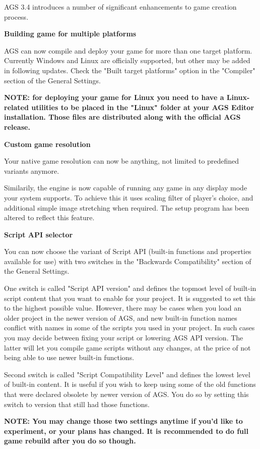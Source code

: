 AGS 3.4 introduces a number of significant enhancements to game creation process.

\bf{Building game for multiple platforms}

AGS can now compile and deploy your game for more than one target platform. Currently Windows and
Linux are officially supported, but other may be added in following updates. Check the "Built target platforms"
option in the "Compiler" section of the General Settings.

\bf{NOTE:} for deploying your game for Linux you need to have a Linux-related utilities to be placed in the
"Linux" folder at your AGS Editor installation. Those files are distributed along with the official AGS
release.

\bf{Custom game resolution}

Your native game resolution can now be anything, not limited to predefined variants anymore.

Similarily, the engine is now capable of running any game in any display mode your system supports.
To achieve this it uses scaling filter of player's choice, and additional simple image stretching
when required. The setup program has been altered to reflect this feature.

\bf{Script API selector}

You can now choose the variant of Script API (built-in functions and properties available for use)
with two switches in the "Backwards Compatibility" section of the General Settings.

One switch is called "Script API version" and defines the topmost level of built-in script content
that you want to enable for your project. It is suggested to set this to the highest possible
value. However, there may be cases when you load an older project in the newer version of AGS,
and new built-in function names conflict with names in some of the scripts you used in your
project. In such cases you may decide between fixing your script or lowering AGS API version.
The latter will let you compile game scripts without any changes, at the price of not being able
to use newer built-in functions.

Second switch is called "Script Compatibility Level" and defines the lowest level of built-in
content. It is useful if you wish to keep using some of the old functions that were declared
obsolete by newer version of AGS. You do so by setting this switch to version that still had
those functions.

\bf{NOTE:} You may change those two settings anytime if you'd like to experiment, or your plans
has changed. It is recommended to do full game rebuild after you do so though.

